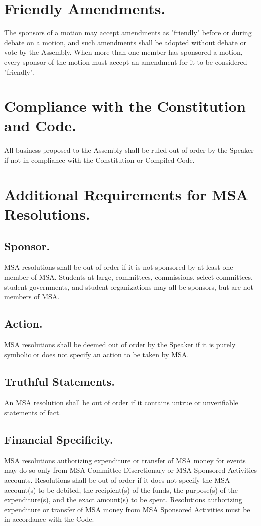 \documentclass{rules}
\begin{document}
\section{Friendly Amendments.}
The sponsors of a motion may accept amendments as "friendly" before or during debate on a motion, and such amendments shall be adopted without debate or vote by the Assembly.  When more than one member has sponsored a motion, every sponsor of the motion must accept an amendment for it to be considered "friendly".

\section{Compliance with the Constitution and Code.}
All business proposed to the Assembly shall be ruled out of order by the Speaker if not in compliance with the Constitution or Compiled Code.


\section{Additional Requirements for MSA Resolutions.}
\subsection{Sponsor.}
MSA resolutions shall be out of order if it is not sponsored by at least one member of MSA.  Students at large, committees, commissions, select committees, student governments, and student organizations may all be sponsors, but are not members of MSA.
\subsection{Action.}
MSA resolutions shall be deemed out of order by the Speaker if it is purely symbolic or does not specify an action to be taken by MSA.
\subsection{Truthful Statements.}
An MSA resolution shall be out of order if it contains untrue or unverifiable statements of fact.
\subsection{Financial Specificity.}
MSA resolutions authorizing expenditure or transfer of MSA money for events may do so only from MSA Committee Discretionary or MSA Sponsored Activities accounts.  Resolutions shall be out of order if it does not specify the MSA account(s) to be debited, the recipient(s) of the funds, the purpose(s) of the expenditure(s), and the exact amount(s) to be spent.  Resolutions authorizing expenditure or transfer of MSA money from MSA Sponsored Activities must be in accordance with the Code.
\end{document}
